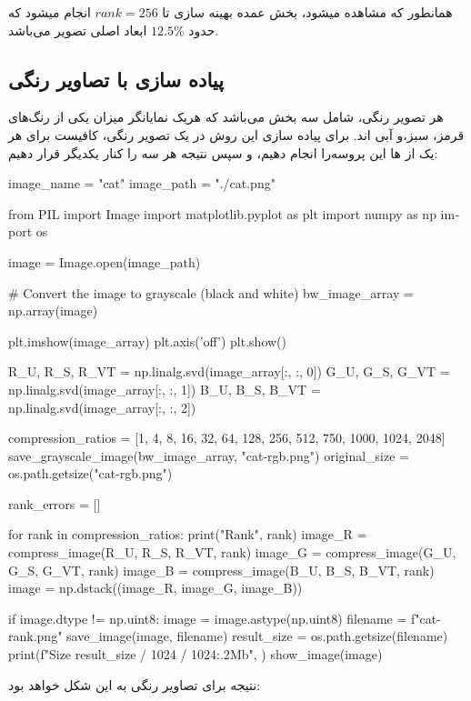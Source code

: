 همانطور که مشاهده میشود، بخش عمده بهینه سازی تا
$rank=256$
انجام میشود که حدود
$12.5\%$
ابعاد اصلی تصویر می‌باشد.


\subsection{پیاده سازی با تصاویر رنگی}
هر تصویر رنگی، شامل سه بخش
می‌باشد که هریک نمایانگر میزان یکی از رنگ‌های قرمز، سبز،و آبی اند.
برای پیاده سازی این روش در یک تصویر رنگی، کافیست برای هر یک از
ها این پروسه‌را انجام دهیم، و سپس نتیجه هر سه را کنار یکدیگر قرار دهیم:



\begin{latin}
  \begin{python}
image_name = "cat"
image_path = "./cat.png"


from PIL import Image
import matplotlib.pyplot as plt
import numpy as np
import os

image = Image.open(image_path)

# Convert the image to grayscale (black and white)
bw_image_array = np.array(image)

plt.imshow(image_array)
plt.axis('off')
plt.show()

R_U, R_S, R_VT = np.linalg.svd(image_array[:, :, 0])
G_U, G_S, G_VT = np.linalg.svd(image_array[:, :, 1])
B_U, B_S, B_VT = np.linalg.svd(image_array[:, :, 2])

compression_ratios = [1, 4, 8, 16, 32, 64, 128, 256, 512, 750, 1000, 1024, 2048]
save_grayscale_image(bw_image_array, "cat-rgb.png")
original_size = os.path.getsize("cat-rgb.png")

rank_errors = []

for rank in compression_ratios:
    print("Rank", rank)
    image_R = compress_image(R_U, R_S, R_VT, rank)
    image_G = compress_image(G_U, G_S, G_VT, rank)
    image_B = compress_image(B_U, B_S, B_VT, rank)
    image = np.dstack((image_R, image_G, image_B))

    if image.dtype != np.uint8:
        image = image.astype(np.uint8)
    filename = f"cat-{rank}.png"
    save_image(image, filename)
    result_size = os.path.getsize(filename)
    print(f"Size {result_size / 1024 / 1024:.2}Mb", )
    show_image(image)

  \end{python}
\end{latin}


نتیجه برای تصاویر رنگی به این شکل خواهد بود:


